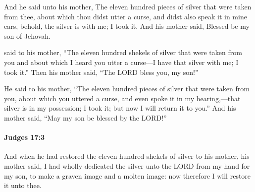 			\begin{versebox}
					\item[BHS] 
					\item[ASV] And he said unto his mother, The eleven hundred pieces of silver that were taken from thee, about which thou didst utter a curse, and didst also speak it in mine ears, behold, the silver is with me; I took it. And his mother said, Blessed be my son of Jehovah.
					\item[NIV] said to his mother, “The eleven hundred shekels of silver that were taken from you and about which I heard you utter a curse—I have that silver with me; I took it.” Then his mother said, “The LORD bless you, my son!”
					\item[NRSV] He said to his mother, “The eleven hundred pieces of silver that were taken from you, about which you uttered a curse, and even spoke it in my hearing,—that silver is in my possession; I took it; but now I will return it to you.” And his mother said, “May my son be blessed by the LORD!”
			\end{versebox}

		\paragraph{Judges 17:3} %
			\label{JUDGES-17-3}

			And when he had restored the eleven hundred shekels of silver to his mother, his mother said, I had wholly dedicated the silver unto the LORD from my hand for my son, to make a graven image and a molten image: now therefore I will restore it unto thee.

